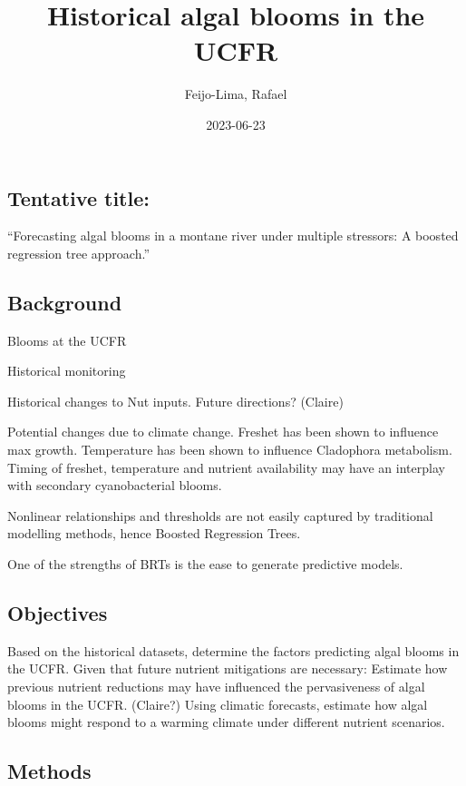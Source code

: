 \documentclass[
]{article}
\title{Historical algal blooms in the UCFR}
\author{Feijo-Lima, Rafael}
\date{2023-06-23}
\begin{document}
\maketitle

\hypertarget{tentative-title}{%
\subsection{Tentative title:}\label{tentative-title}}

``Forecasting algal blooms in a montane river under multiple stressors:
A boosted regression tree approach.''

\hypertarget{background}{%
\subsection{Background}\label{background}}

Blooms at the UCFR

Historical monitoring

Historical changes to Nut inputs. Future directions? (Claire)

Potential changes due to climate change. Freshet has been shown to
influence max growth. Temperature has been shown to influence Cladophora
metabolism. Timing of freshet, temperature and nutrient availability may
have an interplay with secondary cyanobacterial blooms.

Nonlinear relationships and thresholds are not easily captured by
traditional modelling methods, hence Boosted Regression Trees.

One of the strengths of BRTs is the ease to generate predictive models.

\hypertarget{objectives}{%
\subsection{Objectives}\label{objectives}}

Based on the historical datasets, determine the factors predicting algal
blooms in the UCFR. Given that future nutrient mitigations are
necessary: Estimate how previous nutrient reductions may have influenced
the pervasiveness of algal blooms in the UCFR. (Claire?) Using climatic
forecasts, estimate how algal blooms might respond to a warming climate
under different nutrient scenarios.

\hypertarget{methods}{%
\subsection{Methods}\label{methods}}
\end{document}
